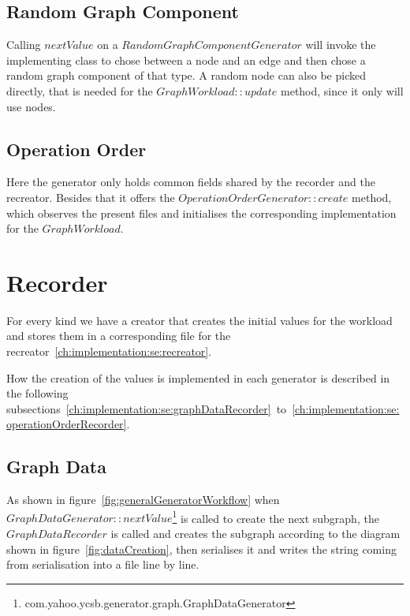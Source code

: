 \subsection{Random Graph Component}
Calling $ nextValue $ on a $ RandomGraphComponentGenerator $ will invoke the implementing class to chose between a node and an edge and then chose a random graph component of that type.
A random node can also be picked directly,
that is needed for the $ GraphWorkload::update $ method,
since it only will use nodes.

\subsection{Operation Order}
Here the generator only holds common fields shared by the recorder and the recreator.
Besides that it offers the $ OperationOrderGenerator::create $ method,
which observes the present files and initialises the corresponding implementation for the $ Graph Workload $.

\section{Recorder}
\label{ch:implementation:se:recorder}
For every kind we have a creator that creates the initial values for the workload and stores them in a corresponding file for the recreator~\ref{ch:implementation:se:recreator}.

How the creation of the values is implemented in each generator is described in the following subsections~\ref{ch:implementation:se:graphDataRecorder}~to~\ref{ch:implementation:se:operationOrderRecorder}.

\subsection{Graph Data}
\label{ch:implementation:se:graphDataRecorder}
As shown in figure~\ref{fig:generalGeneratorWorkflow} when $ GraphDataGenerator::nextValue $\footnote{com.yahoo.ycsb.generator.graph.GraphDataGenerator} is called to create the next subgraph,
the $ GraphDataRecorder $ is called and creates the subgraph according to the diagram shown in figure~\ref{fig:dataCreation},
then serialises it and writes the string coming from serialisation into a file line by line.

